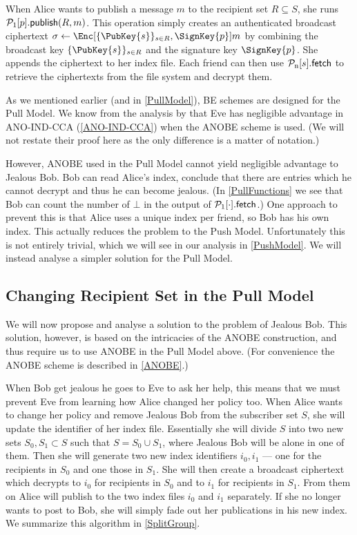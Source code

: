 When Alice wants to publish a message \(m\) to the recipient set \(R\subseteq 
  S\), she runs \(\ppub{p}[R][m]\).
This operation simply creates an authenticated broadcast ciphertext 
\(\sigma\gets \Enc[\{\PubKey{s}\}_{s\in R}, \SignKey{p}]{m}\) by combining the 
broadcast key \(\{\PubKey{s}\}_{s\in R}\) and the signature key 
\(\SignKey{p}\).
She appends the ciphertext to her index file.
Each friend can then use \(\pnget{s}\) to retrieve the ciphertexts from the 
file system and decrypt them.

As we mentioned earlier (and in \cref{PullModel}), \ac{BE} schemes are designed 
for the Pull Model.
We know from the analysis by \citet{ANOBE} that Eve has negligible advantage in 
ANO-IND-CCA (\cref{ANO-IND-CCA}) when the \ac{ANOBE} scheme is used.
(We will not restate their proof here as the only difference is a matter of 
notation.)

However, \ac{ANOBE} used in the Pull Model cannot yield negligible advantage to
Jealous Bob.
Bob can read Alice's index, conclude that there are entries which he cannot 
decrypt and thus he can become jealous.
(In \cref{PullFunctions} we see that Bob can count the number of \(\bot\) in 
the output of \(\pget{\cdot}\).)
One approach to prevent this is that Alice uses a unique index per friend, so 
Bob has his own index.
This actually reduces the problem to the Push Model.
Unfortunately this is not entirely trivial, which we will see in our analysis 
in \cref{PushModel}.
We will instead analyse a simpler solution for the Pull Model.

\subsection{Changing Recipient Set in the Pull Model}
\label{ChangingPullRecipientSet}

We will now propose and analyse a solution to the problem of Jealous Bob.
This solution, however, is based on the intricacies of the \ac{ANOBE} 
construction, and thus require us to use \ac{ANOBE} in the Pull Model above.
(For convenience the \ac{ANOBE} scheme is described in \cref{ANOBE}.)

When Bob get jealous he goes to Eve to ask her help, this means that we must 
prevent Eve from learning how Alice changed her policy too.
When Alice wants to change her policy and remove Jealous Bob from the 
subscriber set \(S\), she will update the identifier of her index file.
Essentially she will divide \(S\) into two new sets \(S_0, S_1\subset S\) such 
that \(S = S_0\cup S_1\), where Jealous Bob will be alone in one of them.
Then she will generate two new index identifiers \(i_0, i_1\) --- one for the 
recipients in \(S_0\) and one those in \(S_1\).
She will then create a broadcast ciphertext which decrypts to \(i_0\) for 
recipients in \(S_0\) and to \(i_1\) for recipients in \(S_1\).
From them on Alice will publish to the two index files \(i_0\) and \(i_1\) 
separately.
If she no longer wants to post to Bob, she will simply fade out her 
publications in his new index.
We summarize this algorithm in \cref{SplitGroup}.

